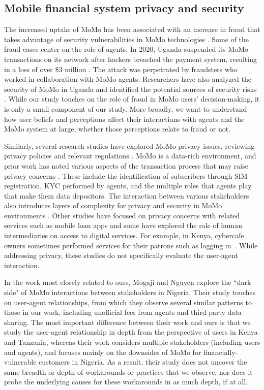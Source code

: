 \subsection{Mobile financial system privacy and security}
The increased uptake of MoMo has been associated with an increase in fraud that takes advantage of security vulnerabilities in MoMo technologies \cite{reaves2017mo}. Some of the fraud cases center on the role of agents. In 2020, Uganda suspended its MoMo transactions on its network after hackers breached the payment system, resulting in a loss of over \$3 million  \cite{kafeero_2020}. The attack was perpetrated by fraudsters who worked in collaboration with MoMo agents. Researchers have also analyzed the security of MoMo in Uganda and identified the potential sources of security risks \cite{ali2020evaluation}. 
While our study touches on the role of fraud in MoMo users' decision-making,  it is only a small component of our study. More broadly, we want to understand how user beliefs and perceptions affect their interactions with agents and the MoMo system at large, whether those perceptions relate to fraud or not.

Similarly, several research studies have explored MoMo privacy issues, reviewing privacy policies and relevant regulations   \cite{bowers2017regulators} \cite{harris2012privacy}. MoMo is a data-rich environment, and prior work has noted various aspects of the transaction process that may raise privacy concerns \cite{makulilo2015privacy}. These include the identification of subscribers through SIM registration, KYC performed by agents, and the multiple roles that agents play that make them data depositors. The interaction between various stakeholders also introduces layers of complexity for privacy and security in MoMo environments \cite{mogaji2022dark}. Other studies have focused on privacy concerns with related services such as mobile loan apps \cite{munyendo2022desperate} and some have explored the role of human intermediaries on access to digital services. For example, in Kenya,  cybercafe owners sometimes performed services for their patrons such as logging in~\cite{munyendoeighty}.  While addressing privacy, these studies do not specifically evaluate the user-agent interaction. 

In the work most closely related to ours, Mogaji and Nguyen \cite{mogaji2022dark} explore the ``dark side" of MoMo interactions between stakeholders in Nigeria. 
Their study touches on user-agent relationships, from which they observe several similar patterns to those in our work, including unofficial fees from agents and third-party data sharing. 
The most important difference between their work and ours is that we study the user-agent relationship in depth from the perspective of users in Kenya and Tanzania, whereas their work considers multiple stakeholders (including users and agents), and focuses mainly on the downsides of MoMo for financially-vulnerable customers in Nigeria.
As a result, their study does not uncover the same breadth or depth of workarounds or practices that we observe, nor does it probe the underlying causes for these workarounds in as much depth, if at all. 